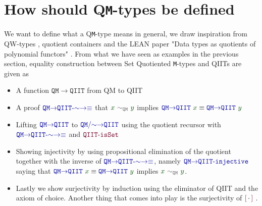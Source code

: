 \documentclass[twoside,11pt,openright]{report}
\theoremstyle{plain} %
\theoremstyle{definition}
\theoremstyle{remark}
\newcommand*{\term}[1]{\textcolor{green!30!black}{#1}} %
\newcommand*{\relation}[1]{\textcolor{gray!75!black}{\ensuremath{\mathtt{#1}}}}
\newcommand*{\function}[1]{\textcolor{blue!60!black}{\ensuremath{\mathtt{#1}}}}
\newcommand*{\constructor}[1]{\textcolor{purple!60!black}{\ensuremath{\mathtt{#1}}}}
\newcommand*{\quotientconstructor}[1]{\constructor{[}\,#1\,\constructor{]}}
\begin{document}
\section{How should Q\texttt{M}-types be defined}
We want to define what a Q\texttt{M}-type means in general, we draw inspiration from QW-types \cite{DBLP:Constructing-QIITs}, quotient containers \cite{DBLP:quotient-container} and the LEAN paper "Data types as quotients of polynomial functors" \cite{DBLP:QM-lean}. From what we have seen as examples in the previous section, equality construction between Set Quotiented \texttt{M}-types and QIITs are given as
\begin{itemize}
\item A function \function{QM{\rightarrow}QIIT} from QM to QIIT
\item A proof \(\function{QM{\rightarrow}QIIT\text{-}{\sim}{\rightarrow}{\equiv}}\) that \(\term{x}~\relation{\sim_{QM}}~\term{y}\) implies \(\function{QM{\rightarrow}QIIT}~\term{x} \equiv \function{QM{\rightarrow}QIIT}~\term{y}\)
\item Lifting \(\function{QM{\rightarrow}QIIT}\) to \(\function{QM/{\sim}{\rightarrow}QIIT}\) using the quotient recursor with \(\function{QM{\rightarrow}QIIT\text{-}{\sim}{\rightarrow}{\equiv}}\) and \(\constructor{QIIT\text{-}isSet}\)
\item Showing injectivity by using propositional elimination of the quotient together with the inverse of \(\function{QM{\rightarrow}QIIT\text{-}{\sim}{\rightarrow}{\equiv}}\), namely \(\function{QM{\rightarrow}QIIT\text{-}injective}\) saying that \(\function{QM{\rightarrow}QIIT}~\term{x} \equiv \function{QM{\rightarrow}QIIT}~\term{y}\) implies \(\term{x}~\relation{\sim_{QM}}~\term{y}\).
\item Lastly we show surjectivity by induction using the eliminator of QIIT and the axiom of choice. Another thing that comes into play is the surjectivity of \(\quotientconstructor{{\cdot}}\) \cite[6.10.2]{hottbook}.
\end{itemize}

\end{document}
